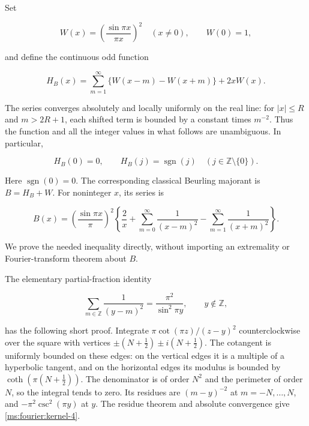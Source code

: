 Set

\[
 W(x)=\left(\frac{\sin\pi x}{\pi x}\right)^2\quad(x\ne0),
 \qquad W(0)=1,
\]

and define the continuous odd function

\begin{equation}
 H_B(x)=\sum_{m=1}^{\infty}\{W(x-m)-W(x+m)\}+2xW(x).
 \label{ms:fourier:kernel-1}
\end{equation}

The series converges absolutely and locally uniformly on the real line:
for \(|x|\le R\) and \(m>2R+1\), each shifted term is bounded by a
constant times \(m^{-2}\). Thus the function and all the integer values in
what follows are unambiguous. In particular,

\begin{equation}
 H_B(0)=0,\qquad H_B(j)=\operatorname{sgn}(j)
 \quad(j\in\mathbb Z\setminus\{0\}).                 \label{ms:fourier:kernel-2}
\end{equation}

Here \(\operatorname{sgn}(0)=0\). The corresponding classical Beurling
majorant is \(B=H_B+W\). For noninteger \(x\), its series is

\begin{equation}
 B(x)=\left(\frac{\sin\pi x}{\pi}\right)^2
 \left\{\frac2x+\sum_{m=0}^{\infty}\frac1{(x-m)^2}
                    -\sum_{m=1}^{\infty}\frac1{(x+m)^2}\right\}.
 \label{ms:fourier:kernel-3}
\end{equation}

We prove the needed inequality directly, without importing an extremality
or Fourier-transform theorem about \(B\).

The elementary partial-fraction identity

\begin{equation}
 \sum_{m\in\mathbb Z}\frac1{(y-m)^2}
       =\frac{\pi^2}{\sin^2\pi y},\qquad y\notin\mathbb Z,
 \label{ms:fourier:kernel-4}
\end{equation}

has the following short proof. Integrate
\(\pi\cot(\pi z)/(z-y)^2\) counterclockwise over the square with vertices
\(\pm(N+\tfrac12)\pm i(N+\tfrac12)\). The cotangent is uniformly bounded
on these edges: on the vertical edges it is a multiple of a hyperbolic
tangent, and on the horizontal edges its modulus is bounded by
\(\coth(\pi(N+\tfrac12))\). The denominator is of order \(N^2\) and the
perimeter of order \(N\), so the integral tends to zero. Its residues are
\((m-y)^{-2}\) at \(m=-N,\ldots,N\), and
\(-\pi^2\csc^2(\pi y)\) at \(y\). The residue theorem and absolute
convergence give \eqref{ms:fourier:kernel-4}.

